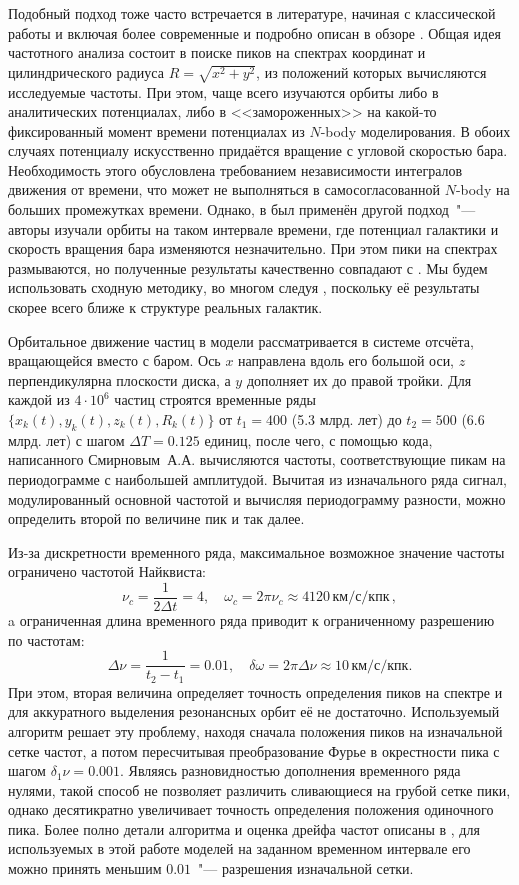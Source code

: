 \documentclass{trlnotes}
\begin{document}
Подобный подход тоже часто встречается в литературе, начиная с классической работы \citet{binney1982} и
включая более современные \citep{athanassoula2002,portail2015,valluri2016} и подробно описан в обзоре
\citet{athanassoula2013}. Общая идея частотного анализа состоит в поиске пиков на спектрах координат и
цилиндрического радиуса $R = \sqrt{x^2 + y^2}$, из положений которых вычисляются исследуемые частоты.
При этом, чаще всего изучаются орбиты либо в аналитических потенциалах, либо в <<замороженных>> на какой-то
фиксированный момент времени потенциалах из $N$-body моделирования. В обоих случаях потенциалу искусственно
придаётся вращение с угловой скоростью бара. Необходимость этого обусловлена требованием независимости интегралов
движения от времени, что может не выполняться в самосогласованной $N$-body на больших промежутках времени. Однако,
в \citet{ceverino2007} был применён другой подход~"--- авторы изучали орбиты на таком интервале времени, где
потенциал галактики и скорость вращения бара изменяются незначительно. При этом пики на спектрах размываются, но
полученные результаты качественно совпадают с \cite{athanassoula2002a}.
Мы будем использовать сходную методику, во многом следуя \citet{gajda2016}, поскольку её результаты скорее всего
ближе к структуре реальных галактик.

Орбитальное движение частиц в модели рассматривается в системе отсчёта, вращающейся вместо с баром. Ось $x$
направлена вдоль его большой оси, $z$ перпендикулярна плоскости диска, а $y$ дополняет их до правой тройки.  Для
каждой из $4\cdot 10^6$ частиц строятся временные ряды $\{x_k(t), y_k(t), z_k(t), R_k(t)\}$ от $t_1=400$ (5.3
млрд. лет) до $t_2=500$ (6.6 млрд. лет) с шагом $ΔT = 0.125$ единиц, после чего, с помощью кода, написанного
Смирновым~А.А. \quest{} вычисляются частоты, соответствующие пикам на
периодограмме с наибольшей амплитудой. Вычитая из изначального ряда сигнал, модулированный основной частотой и
вычисляя периодограмму разности, можно определить второй по величине пик и так далее. 

Из-за дискретности временного ряда, максимальное возможное значение частоты ограничено частотой Найквиста: 
\[
  ν_c = \frac{1}{2 Δt} = 4, \quad ω_c = 2\pi ν_c \approx 4120\,\text{км}/\text{с}/\text{кпк}\,,
\]
a ограниченная длина временного ряда приводит к ограниченному разрешению по частотам: 
\[
  Δν = \frac{1}{t_2 - t_1} = 0.01, \quad δω = 2\pi Δν \approx 10\,\text{км}/\text{с}/\text{кпк}.
\]
При этом, вторая величина определяет точность определения пиков на спектре и для аккуратного выделения резонансных
орбит её не достаточно. Используемый алгоритм решает эту проблему, находя сначала положения пиков на изначальной
сетке частот, а потом пересчитывая преобразование Фурье в окрестности пика с шагом $δ_1ν = 0.001$. Являясь
разновидностью дополнения временного ряда нулями, такой способ не позволяет различить сливающиеся на грубой сетке
пики, однако десятикратно увеличивает точность определения положения одиночного пика. Более полно детали алгоритма
и оценка дрейфа частот описаны в \citet{parul2020}, для используемых в этой работе моделей на заданном временном
интервале его можно принять меньшим $0.01$~"--- разрешения изначальной сетки.
\end{document}
